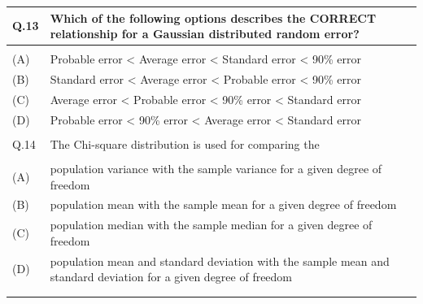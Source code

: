 \documentclass[12pt]{article}
\begin{document}
\begin{table}[H]
\renewcommand{\arraystretch}{3}
\setlength{\tabcolsep}{8pt}
\begin{tabular}{|l|p{15cm}|}
\hline

Q.13 &Which of the following options describes the CORRECT relationship for a
Gaussian distributed random error?\\ \hline 
 & \\ \hline
(A)&Probable error < Average error < Standard error < 90\% error\\ \hline
(B)&Standard error < Average error < Probable error < 90\% error \\ \hline
(C)&Average error < Probable error < 90\% error < Standard error\\ \hline
(D)&Probable error < 90\% error < Average error < Standard error \\ \hline
 & \\ \hline

Q.14 & The Chi-square distribution is used for comparing the\\ \hline
 & \\ \hline
(A)&population variance with the sample variance for a given degree of freedom\\ \hline
(B)&population mean with the sample mean for a given degree of freedom\\ \hline
(C)&population median with the sample median for a given degree of freedom \\ \hline
(D)&population mean and standard deviation with the sample mean and standard
deviation for a given degree of freedom\\ \hline
 & \\ 
 & \\ \hline

\end{tabular}
\end{table}
\end{document}
